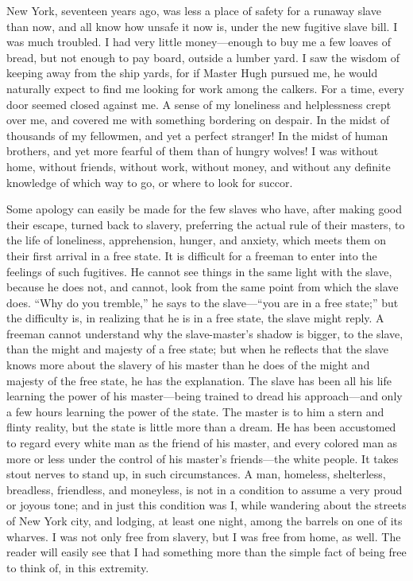 New York, seventeen years ago, was less a place of safety for a runaway
slave than now, and all know how unsafe it now is, under the new
fugitive slave bill. I was much troubled. I had very little
money---enough to buy me a few loaves of bread, but not enough to pay
board, outside a lumber yard. I saw the wisdom of keeping away from the
ship yards, for if Master Hugh pursued me, he would naturally expect to
find me looking for work among the calkers. For a time, every door
seemed closed against me. A sense of my loneliness and helplessness
crept over me, and covered me with something bordering on despair. In
the midst of thousands of my {\protect\hypertarget{339}{}{}}fellowmen,
and yet a perfect stranger! In the midst of human brothers, and yet more
fearful of them than of hungry wolves! I was without home, without
friends, without work, without money, and without any definite knowledge
of which way to go, or where to look for succor.

Some apology can easily be made for the few slaves who have, after
making good their escape, turned back to slavery, preferring the actual
rule of their masters, to the life of loneliness, apprehension, hunger,
and anxiety, which meets them on their first arrival in a free state. It
is difficult for a freeman to enter into the feelings of such fugitives.
He cannot see things in the same light with the slave, because he does
not, and cannot, look from the same point from which the slave does.
``Why do you tremble,'' he says to the slave---``you are in a free
state;'' but the difficulty is, in realizing that he is in a free state,
the slave might reply. A freeman cannot understand why the
slave-master's shadow is bigger, to the slave, than the might and
majesty of a free state; but when he reflects that the slave knows more
about the slavery of his master than he does of the might and majesty of
the free state, he has the explanation. The slave has been all his life
learning the power of his master---being trained to dread his
approach---and only a few hours learning the power of the state. The
master is to him a stern and flinty reality, but the state is little
more than a dream. He has been accustomed to regard every white man as
the friend of his master, and every colored man as more or less under
the control of his {\protect\hypertarget{340}{}{}}master's friends---the
white people. It takes stout nerves to stand up, in such circumstances.
A man, homeless, shelterless, breadless, friendless, and moneyless, is
not in a condition to assume a very proud or joyous tone; and in just
this condition was I, while wandering about the streets of New York
city, and lodging, at least one night, among the barrels on one of its
wharves. I was not only free from slavery, but I was free from home, as
well. The reader will easily see that I had something more than the
simple fact of being free to think of, in this extremity.

